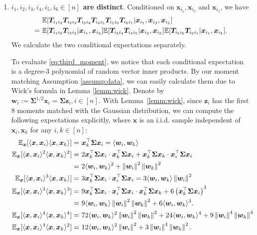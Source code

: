 \documentclass[twoside,11pt]{article}
\newcommand{\norm}[1]{\left\|#1\right\|}
\newcommand{\bw}{\boldsymbol{w}}
\newcommand{\E}{\mathbb{E}}
\def\bw{{\boldsymbol w}}
\def\bx{{\boldsymbol x}}
\def\bz{{\boldsymbol z}}
\def\bSigma{{\boldsymbol \Sigma}}
\def\T{{\mathbb T}}
\def\T{{\mathbb T}}
\renewcommand{\T}{\boldsymbol{T}}
\newcommand{\1}{\mathbf{1}}
\begin{document}
\begin{enumerate}[label=\textbf{Case (\roman*).},leftmargin=0ex, itemindent=12ex]
\item \textbf{$i_1,i_2,i_3,i_4,i_5,i_6\in [n]$ are distinct}. Conditioned on $\bx_{i_1},\bx_{i_3}$ and $\bx_{i_5}$, we have 
\begin{align} &\E[\T_{i_1i_2}\T_{i_2i_3}\T_{i_3i_4}\T_{i_4i_5}\T_{i_5i_6}\T_{i_6i_1}| \bx_{i_1},\bx_{i_3},\bx_{i_5}] \notag \\
=~&\E[\T_{i_1i_2}\T_{i_2i_3}|\bx_{i_1},\bx_{i_3}]\E[\T_{i_3i_4}\T_{i_4i_5}|\bx_{i_3},\bx_{i_5}]\E[\T_{i_5i_6}\T_{i_6i_1}|\bx_{i_1},\bx_{i_5}].\label{eq:third_moment}
\end{align}
We calculate the two conditional expectations separately. 




To evaluate \eqref{eq:third_moment}, we notice that each conditional expectation is a degree-3 polynomial of random vector inner products. By our moment matching Assumption \ref{assump:data}, we can easily calculate them due to Wick's formula in Lemma \ref{lemm:wick}. Denote by $\bw_i:=\bSigma^{1/2}\bx_i=\bSigma \bz_i, i\in [n]$. 
With Lemma~\ref{lemm:wick}, since $\bz_i$ has the first 8 moments  matched with the Gaussian distribution, we can compute the following expectations explicitly, where $\bx$ is an i.i.d. sample independent of $\bx_i,\bx_k$ for any $i,k\in[n]$: 
\begin{align}
    \E_{\bx}[\langle \bx,\bx_i\rangle \langle \bx,\bx_k\rangle]=&~\bx_k^\top\bSigma\bx_i= \langle \bw_i,\bw_k\rangle \label{eq:moment11}\\
      \E_{\bx}[\langle \bx,\bx_i\rangle^2 \langle \bx,\bx_k\rangle^2]=&~2\bx_k^\top\bSigma\bx_i\cdot \bx_k^\top\bSigma\bx_i+ \bx_k^\top\bSigma\bx_k\cdot \bx_i^\top\bSigma\bx_i \notag \\
      =&~ 2\langle \bw_i,\bw_k\rangle^2+\norm{\bw_i}^2\norm{\bw_k}^2 \label{eq:moment22}\\
    \E_{\bx}[\langle \bx,\bx_i\rangle^3  \langle \bx,\bx_k\rangle]=&~3\bx_k^\top\bSigma\bx_i\cdot\bx_i^\top\bSigma\bx_i=3\langle \bw_i,\bw_k\rangle \norm{\bw_i}^2 \label{eq:moment31}\\
    \E_{\bx}[\langle \bx,\bx_i\rangle^3  \langle \bx,\bx_k\rangle^3]=& ~9\bx_k^\top\bSigma\bx_i\cdot\bx_i^\top\bSigma\bx_i\cdot\bx_k^\top\bSigma\bx_k+6\left(\bx_k^\top\bSigma\bx_i\right)^3 \notag \\
    =& ~9\langle \bw_i,\bw_k\rangle\norm{\bw_i}^2\norm{\bw_k}^2+6\langle \bw_i,\bw_k\rangle^3.  \label{eq:moment33}\\
      \E_{\bx}[\langle \bx,\bx_i\rangle^4  \langle \bx,\bx_k\rangle^4]= & ~72\langle \bw_i,\bw_k\rangle^2\norm{\bw_i}^2\norm{\bw_k}^2+24\langle \bw_i,\bw_k\rangle^4+9\norm{\bw_i}^4\norm{\bw_k}^4 \label{eq:moment44}\\
       \E_{\bx}[\langle \bx,\bx_i\rangle^4  \langle \bx,\bx_k\rangle^2]=&~12\langle \bw_i,\bw_k\rangle^2\norm{\bw_i}^2+3\norm{\bw_i}^4\norm{\bw_k}^2. \label{eq:moment42}
\end{align}


\end{enumerate}
\end{document}
